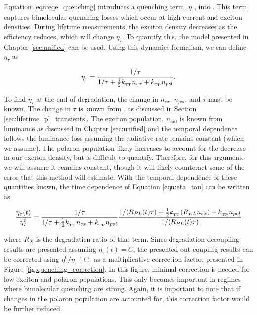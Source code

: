 \documentclass[../thesis.tex]{subfiles}
\begin{document}
Equation \ref{eqn:eqe_quenching} introduces a quenching term, $\eta_\tau$, into \eqe.  
This term captures bimolecular quenching losses which occur at high current and exciton densities.
During lifetime measurements, the exciton density decreases as the efficiency reduces, which will change $\eta_\tau$.
To quantify this, the model presented in Chapter \ref{sec:unified} can be used.
Using this dynamics formalism, we can define $\eta_\tau$ as

\begin{equation}
\eta_\tau=\frac{1/\tau}{1/\tau+\frac{1}{2}k_{_\text{\tiny TT}} n_{ex} +k_{_\text{\tiny TP}} n_{pol}}.
\label{eqn:eta_tau}
\end{equation}

To find $\eta_\tau$ at the end of degradation, the change in $n_{ex}$, $n_{pol}$, and $\tau$ must be known.  
The change in $\tau$ is known from \pl. as discussed in Section \ref{sec:lifetime_pl_transients}.
The exciton population, $n_{ex}$, is known from luminance as discussed in Chapter \ref{sec:unified} and the temporal dependence follows the luminance loss assuming the radiative rate remains constant (which we assume).
The polaron population likely increases to account for the decrease in our exciton density, but is difficult to quantify.
Therefore, for this argument, we will assume it remains constant, though it will likely counteract some of the error that this method will estimate.
With the temporal dependence of these quantities known, the time dependence of Equation \ref{eqn:eta_tau} can be written as


\begin{equation}
\frac{\eta_\tau(t)}{\eta_\tau^0}=\frac{1/\tau}{1/\tau+\frac{1}{2}k_{_\text{\tiny TT}} n_{ex} +k_{_\text{\tiny TP}} n_{pol}}  \frac{1/(R_{PL}(t)\tau)+\frac{1}{2}k_{_\text{\tiny TT}} (R_{EL}n_{ex}) +k_{_\text{\tiny TP}} n_{pol}}{1/(R_{PL}(t)\tau)}
\label{eqn:eta_tau_deg}
\end{equation}

where $R_X$ is the degradation ratio of that term.  
Since degradation decoupling results are presented assuming $\eta_\tau(t)=C$, the presented out-coupling results can be corrected using $\eta_\tau^0/\eta_\tau(t)$ as a multiplicative correction factor, presented in Figure \ref{fig:quenching_correction}.
In this figure, minimal correction is needed for low exciton and polaron populations.  
This only becomes important in regimes where bimolecular quenching are strong.
Again, it is important to note that if changes in the polaron population are accounted for, this correction factor would be further reduced.
\end{document}
